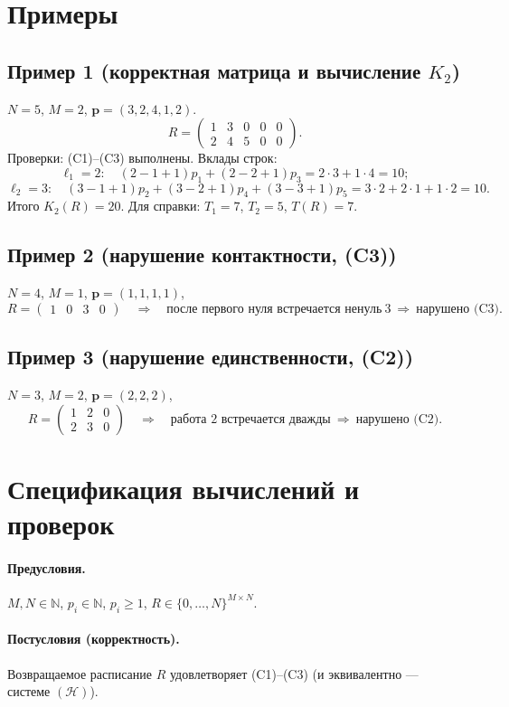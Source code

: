 \documentclass[a4paper,12pt]{article}
\newcommand{\NN}{\mathbb{N}}
\newcommand{\1}{\mathbf{1}} %
\begin{document}
\section{Примеры}
\subsection*{Пример 1 (корректная матрица и вычисление $K_2$)}
$N=5$, $M=2$, $\mathbf{p}=(3,2,4,1,2)$.
\[
  R=
  \begin{pmatrix}
    1 & 3 & 0 & 0 & 0\\
    2 & 4 & 5 & 0 & 0
  \end{pmatrix}.
\]
Проверки: (C1)–(C3) выполнены. Вклады строк:
\[
  \ell_1=2:\quad (2-1+1)p_1+(2-2+1)p_3=2\cdot 3+1\cdot 4=10;
\]
\[
  \ell_2=3:\quad (3-1+1)p_2+(3-2+1)p_4+(3-3+1)p_5
=3\cdot 2+2\cdot 1+1\cdot 2=10.
\]
Итого $K_2(R)=20$. Для справки: $T_1=7$, $T_2=5$, $T(R)=7$.

\subsection*{Пример 2 (нарушение контактности, (C3))}
$N=4$, $M=1$, $\mathbf{p}=(1,1,1,1)$,
\[
  R=\begin{pmatrix}1 & 0 & 3 & 0\end{pmatrix}
  \quad\Rightarrow\quad \text{после первого нуля встречается ненуль}~3~\Rightarrow~\text{нарушено (C3)}.
\]

\subsection*{Пример 3 (нарушение единственности, (C2))}
$N=3$, $M=2$, $\mathbf{p}=(2,2,2)$,
\[
  R=
  \begin{pmatrix}
    1 & 2 & 0\\
    2 & 3 & 0
  \end{pmatrix}
  \quad\Rightarrow\quad \text{работа }2 \text{ встречается дважды}~\Rightarrow~\text{нарушено (C2)}.
\]

\section{Спецификация вычислений и проверок}
\paragraph{Предусловия.} $M,N\in\NN$, $p_i\in\NN$, $p_i\ge 1$, $R\in\{0,\dots,N\}^{M\times N}$.

\paragraph{Постусловия (корректность).} Возвращаемое расписание $R$ удовлетворяет (C1)–(C3) (и эквивалентно — системе $(\mathcal H)$).
\end{document}

